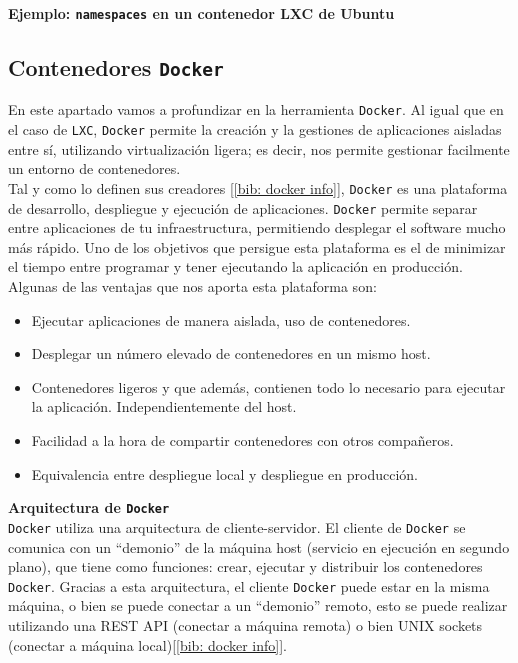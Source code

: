 \documentclass[12pt]{article}
\begin{document}
	\noindent \textbf{\large Ejemplo: \texttt{namespaces} en un contenedor LXC de Ubuntu}\\
	
	
	\pagebreak
	
	\subsection{Contenedores \texttt{Docker}}
	\noindent En este apartado vamos a profundizar en la herramienta \texttt{Docker}. Al igual que en el caso de \texttt{LXC}, \texttt{Docker} permite la creación y la gestiones de aplicaciones aisladas entre sí, utilizando virtualización ligera; es decir, nos permite gestionar facilmente un entorno de contenedores. \\
	
	\noindent Tal y como lo definen sus creadores [\ref{bib: docker info}], \texttt{Docker} es una plataforma de desarrollo, despliegue y ejecución de aplicaciones. \texttt{Docker} permite separar entre aplicaciones de tu infraestructura, permitiendo desplegar el software mucho más rápido. Uno de los objetivos que persigue esta plataforma es el de minimizar el tiempo entre programar y tener ejecutando la aplicación en producción. Algunas de las ventajas que nos aporta esta plataforma son:
	\begin{itemize}
		\item Ejecutar aplicaciones de manera aislada, uso de contenedores.
		\item Desplegar un número elevado de contenedores en un mismo host.
		\item Contenedores ligeros y que además, contienen todo lo necesario para ejecutar la aplicación. Independientemente del host.
		\item Facilidad a la hora de compartir contenedores con otros compañeros.
		\item Equivalencia entre despliegue local y despliegue en producción.
	\end{itemize}

	\vspace{5px}
	\noindent \textbf{\large Arquitectura de \texttt{Docker}}\\
	
	\noindent \texttt{Docker} utiliza una arquitectura de cliente-servidor. El cliente de \texttt{Docker} se comunica con un ``demonio'' de la máquina host (servicio en ejecución en segundo plano), que tiene como funciones: crear, ejecutar y distribuir los contenedores \texttt{Docker}. Gracias a esta arquitectura, el cliente \texttt{Docker} puede estar en la misma máquina, o bien se puede conectar a un ``demonio'' remoto, esto se puede realizar utilizando una REST API (conectar a máquina remota) o bien UNIX sockets (conectar a máquina local)[\ref{bib: docker info}]. 
	
\end{document}

